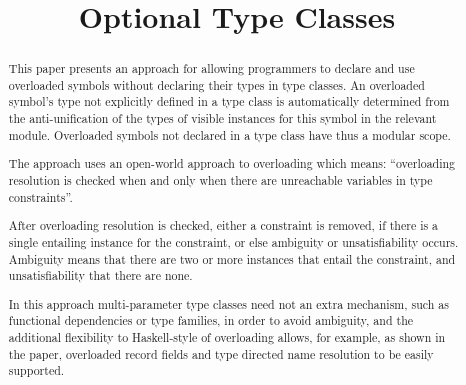 \documentclass[review]{elsarticle}
\begin{document}
\begin{frontmatter}

\title{Optional Type Classes}

\begin{abstract}

This paper presents an approach for allowing programmers to declare
and use overloaded symbols without declaring their types in type
classes. An overloaded symbol's type not explicitly defined in a type
class is automatically determined from the anti-unification of the
types of visible instances for this symbol in the relevant module.
Overloaded symbols not declared in a type class have thus a modular
scope.


The approach uses an open-world approach to overloading which means:
``overloading resolution is checked when and only when there are
unreachable variables in type constraints''.

After overloading resolution is checked, either a constraint is
removed, if there is a single entailing instance for the constraint,
or else ambiguity or unsatisfiability occurs. Ambiguity means that
there are two or more instances that entail the constraint, and
unsatisfiability that there are none.


In this approach multi-parameter type classes need not an extra
mechanism, such as functional dependencies or type families, in order
to avoid ambiguity, and the additional flexibility to Haskell-style of
overloading allows, for example, as shown in the paper, overloaded
record fields and type directed name resolution to be easily
supported.




\end{abstract}
\end{frontmatter}
\end{document}
